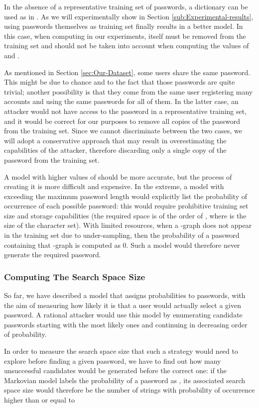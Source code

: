 \documentclass[a4paper,twocolumn]{article}
\begin{document}
In the absence of a representative training set of passwords, a dictionary
can be used as in \cite{Narayanan2005Fast}. As we will experimentally
show in Section \ref{sub:Experimental-results}, using passwords themselves
as training set finally results in a better model. In this case, when
computing  in our experiments, 
itself must be removed from the training set and should not be taken
into account when computing the values of  and .

As mentioned in Section \ref{sec:Our-Dataset}, some users share the
same password. This might be due to chance and to the fact that those
passwords are quite trivial; another possibility is that they come
from the same user registering many accounts and using the same passwords
for all of them. In the latter case, an attacker would not have access
to the password in a representative training set, and it would be
correct for our purposes to remove all copies of the password from
the training set. Since we cannot discriminate between the two cases,
we will adopt a conservative approach that may result in overestimating
the capabilities of the attacker, therefore discarding only a single
copy of the password from the training set.

A model with higher values of  should be more accurate, but the
process of creating it is more difficult and expensive. In the extreme,
a model with  exceeding the maximum password length would explicitly
list the probability of occurrence of each possible password: this
would require prohibitive training set size and storage capabilities
(the required space is of the order of , where
 is the size of the character set). With limited
resources, when a -graph does not appear in the training set due
to under-sampling, then the probability of a password containing that
-graph is computed as 0. Such a model would therefore never generate
the required password.


\subsubsection{Computing The Search Space Size}

So far, we have described a model that assigns probabilities to passwords,
with the aim of measuring how likely it is that a user would actually
select a given password. A rational attacker would use this model
by enumerating candidate passwords starting with the most likely ones
and continuing in decreasing order of probability.

In order to measure the search space size that such a strategy would
need to explore before finding a given password, we have to find out
how many unsuccessful candidates would be generated before the correct
one: if the Markovian model labels the probability of a password as
, its associated search space size would therefore be the number
of strings with probability of occurrence higher than or equal to
\end{document}
